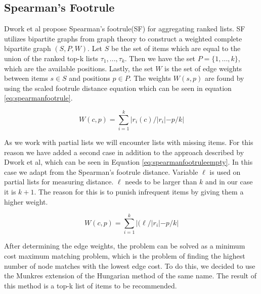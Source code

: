 \subsection{Spearman's Footrule}\label{sec:spearmansfootrule}
Dwork et al propose Spearman's footrule(SF) for aggregating ranked lists\citep{rank:aggregation}.
SF utilizes bipartite graphs from graph theory to construct a weighted complete bipartite graph $(S,P,W)$.
Let $S$ be the set of items which are equal to the union of the ranked top-k lists $\tau_1, ..., \tau_k$. Then we have the set $P = \{1,...,k\}$, which are the available positions. Lastly, the set $W$ is the set of edge weights between items $s\in S$ and positions $p\in P$. The weights $W(s,p)$ are found by using the scaled footrule distance equation which can be seen in equation \ref{eq:spearmanfootrule}.
 
\begin{equation}\label{eq:spearmanfootrule}
W(c,p) = \displaystyle\sum_{i=1}^{k} |r_i(c)/|r_i| - p/k|
\end{equation}

As we work with partial lists we will encounter lists with missing items. For this reason we have added a second case in addition to the approach described by Dwork et al, which can be seen in Equation \ref{eq:spearmanfootruleempty}. In this case we adapt from the Spearman's footrule distance. Variable $\ell$ is used on partial lists for measuring distance. $\ell$ needs to be larger than $k$ and in our case it is $k + 1$. The reason for this is to punish infrequent items by giving them a higher weight.

\begin{equation}\label{eq:spearmanfootruleempty}
W(c,p) = \displaystyle\sum_{i=1}^{k} |(\ell/|r_i| - p/k|
\end{equation}

After determining the edge weights, the problem can be solved as a minimum cost maximum matching problem, which is the problem of finding the highest number of node matches with the lowest edge cost. To do this, we decided to use the Munkres extension of the Hungarian method of the same name\cite{Munkres1957}. The result of this method is a top-k list of items to be recommended.